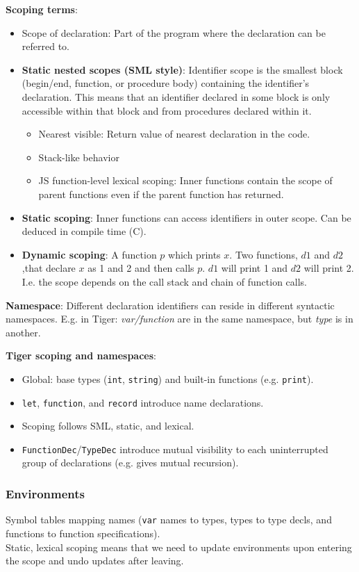 \textbf{Scoping terms}:

\begin{itemize}
    \item Scope of declaration: Part of the program where the declaration can be referred to.
    \item \textbf{Static nested scopes (SML style)}: Identifier scope is the smallest block (begin/end, function, or procedure body) containing the identifier's declaration. This means that an identifier declared in some block is only accessible within that block and from procedures declared within it.
    \begin{itemize}
        \item Nearest visible: Return value of nearest declaration in the code.
        \item Stack-like behavior
        \item JS function-level lexical scoping: Inner functions contain the scope of parent functions even if the parent function has returned.
    \end{itemize}
    \item \textbf{Static scoping}: Inner functions can access identifiers in outer scope. Can be deduced in compile time (C).
    \item \textbf{Dynamic scoping}: A function $p$ which prints $x$. Two functions, $d1$ and $d2$,that declare $x$ as 1 and 2 and then calls $p$. $d1$ will print 1 and $d2$ will print 2. I.e. the scope depends on the call stack and chain of function calls.
\end{itemize}

\textbf{Namespace}: Different declaration identifiers can reside in different syntactic namespaces. E.g. in Tiger: \textit{var/function} are in the same namespace, but \textit{type} is in another.

\textbf{Tiger scoping and namespaces}:
\begin{itemize}
    \item Global: base types (\texttt{int}, \texttt{string}) and built-in functions (e.g. \texttt{print}).
    \item \texttt{let}, \texttt{function}, and \texttt{record} introduce name declarations.
    \item Scoping follows SML, static, and lexical.
    \item \texttt{FunctionDec}/\texttt{TypeDec} introduce mutual visibility to each uninterrupted group of declarations (e.g. gives mutual recursion).
\end{itemize}

\subsubsection{Environments}

Symbol tables mapping names (\texttt{var} names to types, types to type decls, and functions to function specifications).\\

Static, lexical scoping means that we need to update environments upon entering the scope and undo updates after leaving.



